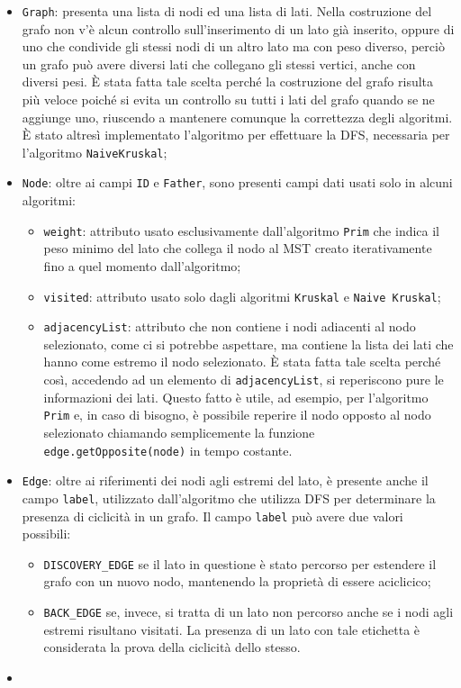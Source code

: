 \begin{itemize}
	\item \texttt{Graph}: presenta una lista di nodi ed una lista di lati. Nella costruzione del grafo non v'è alcun controllo sull'inserimento di un lato già inserito, oppure di uno che condivide gli stessi nodi di un altro lato ma con peso diverso, perciò un grafo può avere diversi lati che collegano gli stessi vertici, anche con diversi pesi. È stata fatta tale scelta perché la costruzione del grafo risulta più veloce poiché si evita un controllo su tutti i lati del grafo quando se ne aggiunge uno, riuscendo a mantenere comunque la correttezza degli algoritmi. È stato altresì implementato l'algoritmo per effettuare la DFS, necessaria per l'algoritmo \texttt{NaiveKruskal};
	\item \texttt{Node}: oltre ai campi \texttt{ID} e \texttt{Father}, sono presenti campi dati usati solo in alcuni algoritmi:
	\begin{itemize}
		\item \texttt{weight}: attributo usato esclusivamente dall'algoritmo \texttt{Prim} che indica il peso minimo del lato che collega il nodo al MST creato iterativamente fino a quel momento dall'algoritmo;
		\item \texttt{visited}: attributo usato solo dagli algoritmi \texttt{Kruskal} e \texttt{Naive Kruskal};
		\item \texttt{adjacencyList}: attributo che non contiene i nodi adiacenti al nodo selezionato, come ci si potrebbe aspettare, ma contiene la lista dei lati che hanno come estremo il nodo selezionato. È stata fatta tale scelta perché così, accedendo ad un elemento di \texttt{adjacencyList}, si reperiscono pure le informazioni dei lati. Questo fatto è utile, ad esempio, per l'algoritmo \texttt{Prim} e, in caso di bisogno, è possibile reperire il nodo opposto al nodo selezionato chiamando semplicemente la funzione \texttt{edge.getOpposite(node)} in tempo costante.
	\end{itemize}
	\item \texttt{Edge}: oltre ai riferimenti dei nodi agli estremi del lato, è presente anche il campo \texttt{label}, utilizzato dall'algoritmo che utilizza DFS per determinare la presenza di ciclicità in un grafo. Il campo \texttt{label} può avere due valori possibili:
	\begin{itemize}
		\item \texttt{DISCOVERY\_EDGE} se il lato in questione è stato percorso per estendere il grafo con un nuovo nodo, mantenendo la proprietà di essere aciclicico;
		\item \texttt{BACK\_EDGE} se, invece, si tratta di un lato non percorso anche se i nodi agli estremi risultano visitati. La presenza di un lato con tale etichetta è considerata la prova della ciclicità dello stesso.
	\end{itemize}	
	\item 
\end{itemize} 

